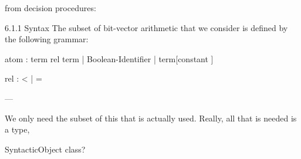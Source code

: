 from decision procedures:

6.1.1 Syntax
The subset of bit-vector arithmetic that we consider is deﬁned by the following grammar: 


atom : term rel term | Boolean-Identiﬁer | term[constant ] 

rel : < | = 



---

We only need the subset of this that is actually used.
Really, all that is needed is a type, 

SyntacticObject class?
